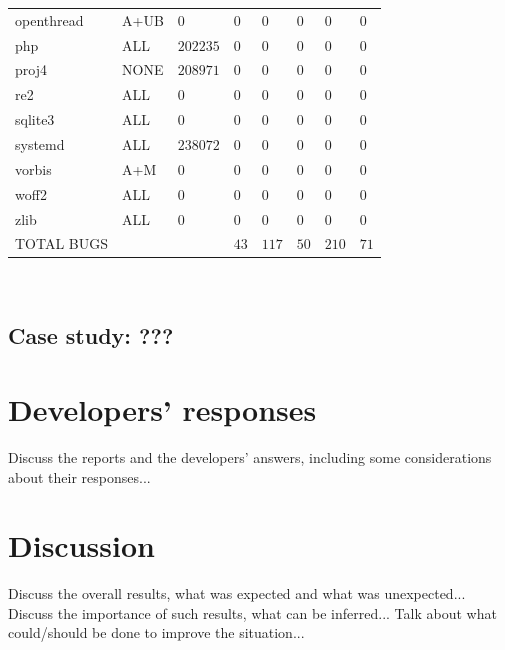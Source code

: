 \begin{adjustbox}{width=\textwidth,center}
\begin{tabular}{|l|l|l|l|l|l|l|l|}
openthread   &A+UB   &$0$   &$0$   &$0$   &$0$   &$0$   &$0$ \\
php   &ALL   &$202235$   &$0$   &$0$   &$0$   &$0$   &$0$ \\
proj4   &NONE   &$208971$   &$0$   &$0$   &$0$   &$0$   &$0$ \\
re2   &ALL   &$0$   &$0$   &$0$   &$0$   &$0$   &$0$ \\
sqlite3   &ALL   &$0$   &$0$   &$0$   &$0$   &$0$   &$0$ \\
systemd   &ALL   &$238072$   &$0$   &$0$   &$0$   &$0$   &$0$ \\
vorbis   &A+M   &$0$   &$0$   &$0$   &$0$   &$0$   &$0$ \\
woff2   &ALL   &$0$   &$0$   &$0$   &$0$   &$0$   &$0$ \\
zlib   &ALL   &$0$   &$0$   &$0$   &$0$   &$0$   &$0$ \\
\hline
TOTAL BUGS   &   &   &$43$   &$117$   &$50$   &$210$   &$71$          \\
\hline
\end{tabular}
\end{adjustbox}{}
\ \\ 



\subsection{Case study: ???}

\newpage
\section{Developers' responses}
Discuss the reports and the developers' answers, including some considerations about their responses...

\newpage
\section{Discussion}
Discuss the overall results, what was expected and what was unexpected...
Discuss the importance of such results, what can be inferred...
Talk about what could/should be done to improve the situation...